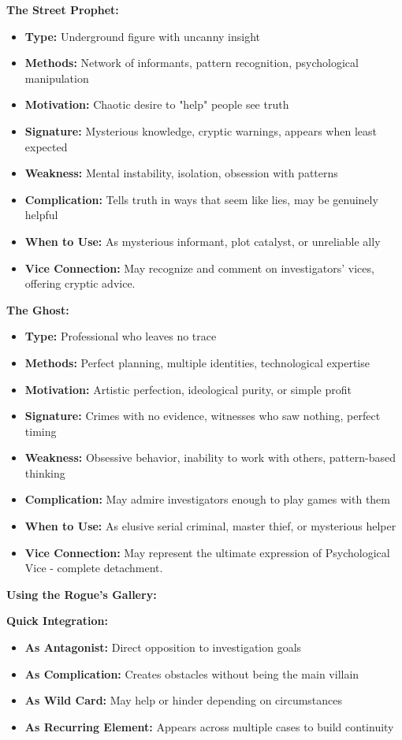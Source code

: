 \documentclass[11pt]{article}
\begin{document}
\textbf{The Street Prophet:}
\begin{itemize}
    \item \textbf{Type:} Underground figure with uncanny insight
    \item \textbf{Methods:} Network of informants, pattern recognition, psychological manipulation
    \item \textbf{Motivation:} Chaotic desire to "help" people see truth
    \item \textbf{Signature:} Mysterious knowledge, cryptic warnings, appears when least expected
    \item \textbf{Weakness:} Mental instability, isolation, obsession with patterns
    \item \textbf{Complication:} Tells truth in ways that seem like lies, may be genuinely helpful
    \item \textbf{When to Use:} As mysterious informant, plot catalyst, or unreliable ally
    \item \textbf{Vice Connection:} May recognize and comment on investigators' vices, offering cryptic advice.
\end{itemize}

\textbf{The Ghost:}
\begin{itemize}
    \item \textbf{Type:} Professional who leaves no trace
    \item \textbf{Methods:} Perfect planning, multiple identities, technological expertise
    \item \textbf{Motivation:} Artistic perfection, ideological purity, or simple profit
    \item \textbf{Signature:} Crimes with no evidence, witnesses who saw nothing, perfect timing
    \item \textbf{Weakness:} Obsessive behavior, inability to work with others, pattern-based thinking
    \item \textbf{Complication:} May admire investigators enough to play games with them
    \item \textbf{When to Use:} As elusive serial criminal, master thief, or mysterious helper
    \item \textbf{Vice Connection:} May represent the ultimate expression of Psychological Vice - complete detachment.
\end{itemize}

\textbf{Using the Rogue's Gallery:}

\textbf{Quick Integration:}
\begin{itemize}
    \item \textbf{As Antagonist:} Direct opposition to investigation goals
    \item \textbf{As Complication:} Creates obstacles without being the main villain
    \item \textbf{As Wild Card:} May help or hinder depending on circumstances
    \item \textbf{As Recurring Element:} Appears across multiple cases to build continuity
\end{itemize}
\end{document}
